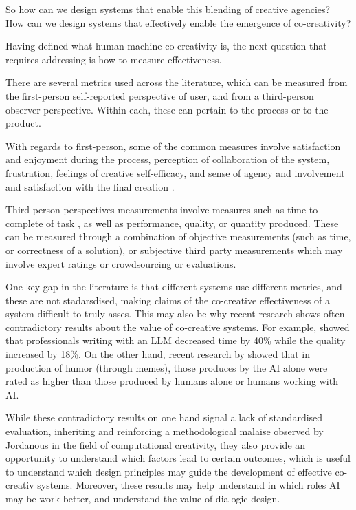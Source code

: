 So how can we design systems that enable this blending of creative agencies? How can we design systems that effectively enable the emergence of co-creativity?

Having defined what human-machine co-creativity is, the next question that requires addressing is how to measure effectiveness. 

There are several metrics used across the literature, which can be measured from the first-person self-reported perspective of user, and from a third-person observer perspective. Within each, these can pertain to the process or to the product. 

With regards to first-person, some of the common measures involve satisfaction and enjoyment during the process, perception of collaboration of the system, frustration, feelings of creative self-efficacy, and sense of agency and involvement and satisfaction with the final creation \cite{Rezwana2022-ui, Rezwana2023-gj, Lawton2023-tb}. 

Third person perspectives measurements involve measures such as time to complete of task \cite{Noy2023-ao}, as well as performance, quality, or quantity produced. These can be measured through a combination of objective measurements (such as time, or correctness of a solution), or subjective third party measurements which may involve expert ratings or crowdsourcing or evaluations. 

One key gap in the literature is that different systems use different metrics, and these are not stadarsdised, making claims of the co-creative effectiveness of a system difficult to truly asses. This may also be why recent research shows often contradictory results about the value of co-creative systems. For example, \cite{Noy2023-ao} showed that professionals writing with an LLM decreased time by 40\% while the quality increased by 18\%. On the other hand, recent research by \cite{Wu2025-or} showed that in production of humor (through memes), those produces by the AI alone were rated as higher than those produced by humans alone or humans working with AI. 

While these contradictory results on one hand signal a lack of standardised evaluation, inheriting and reinforcing a methodological malaise observed by Jordanous in the field of computational creativity, they also provide an opportunity to understand which factors lead to certain outcomes, which is useful to understand which design principles may guide the development of effective co-creativ systems. Moreover, these results may help understand in which roles AI may be work better, and understand the value of dialogic design. 


